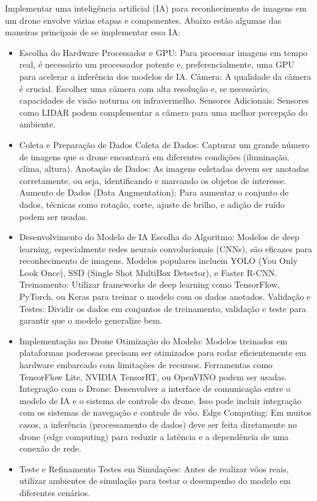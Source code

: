 \documentclass[a4paper,12pt]{article} %
\begin{document}
Implementar uma inteligência artificial (IA) para reconhecimento de imagens em um drone envolve várias etapas e componentes. Abaixo estão algumas das maneiras principais de se implementar essa IA:
\begin{itemize}
\item Escolha do Hardware
Processador e GPU: Para processar imagens em tempo real, é necessário um processador potente e, preferencialmente, uma GPU para acelerar a inferência dos modelos de IA.
Câmera: A qualidade da câmera é crucial. Escolher uma câmera com alta resolução e, se necessário, capacidades de visão noturna ou infravermelho.
Sensores Adicionais: Sensores como LIDAR podem complementar a câmera para uma melhor percepção do ambiente.
\item Coleta e Preparação de Dados
Coleta de Dados: Capturar um grande número de imagens que o drone encontrará em diferentes condições (iluminação, clima, altura).
Anotação de Dados: As imagens coletadas devem ser anotadas corretamente, ou seja, identificando e marcando os objetos de interesse.
Aumento de Dados (Data Augmentation): Para aumentar o conjunto de dados, técnicas como rotação, corte, ajuste de brilho, e adição de ruído podem ser usadas.
\item Desenvolvimento do Modelo de IA
Escolha do Algoritmo: Modelos de deep learning, especialmente redes neurais convolucionais (CNNs), são eficazes para reconhecimento de imagens. Modelos populares incluem YOLO (You Only Look Once), SSD (Single Shot MultiBox Detector), e Faster R-CNN.
Treinamento: Utilizar frameworks de deep learning como TensorFlow, PyTorch, ou Keras para treinar o modelo com os dados anotados.
Validação e Testes: Dividir os dados em conjuntos de treinamento, validação e teste para garantir que o modelo generalize bem.
\item Implementação no Drone
Otimização do Modelo: Modelos treinados em plataformas poderosas precisam ser otimizados para rodar eficientemente em hardware embarcado com limitações de recursos. Ferramentas como TensorFlow Lite, NVIDIA TensorRT, ou OpenVINO podem ser usadas.
Integração com o Drone: Desenvolver a interface de comunicação entre o modelo de IA e o sistema de controle do drone. Isso pode incluir integração com os sistemas de navegação e controle de vôo.
Edge Computing: Em muitos casos, a inferência (processamento de dados) deve ser feita diretamente no drone (edge computing) para reduzir a latência e a dependência de uma conexão de rede.
\item Teste e Refinamento
Testes em Simulações: Antes de realizar vôos reais, utilizar ambientes de simulação para testar o desempenho do modelo em diferentes cenários.

\end{itemize}
\end{document}
